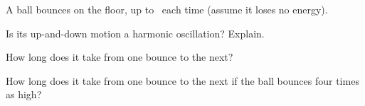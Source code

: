 A ball bounces on the floor, up to \hBO\ each time (assume it loses no energy).

\begin{abcliste}
\abc
Is its up-and-down motion a harmonic oscillation? Explain.

\abc
How long does it take from one bounce to the next?

\abc
How long does it take from one bounce to the next if the ball bounces four times as high?
\end{abcliste}
